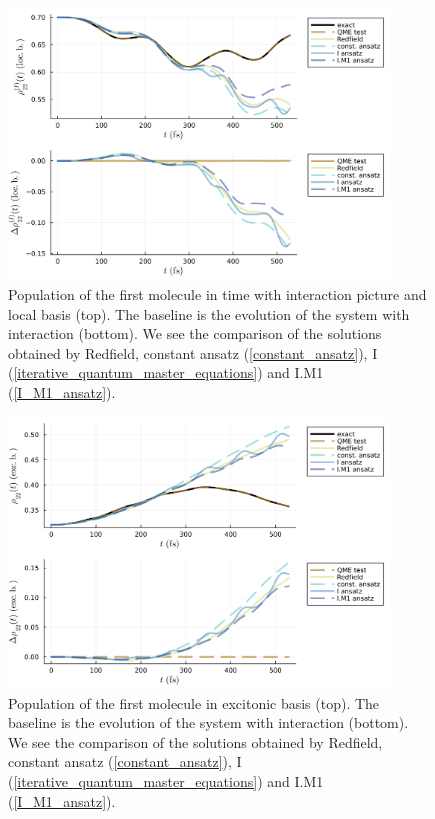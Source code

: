 \newpage
\begin{figure}[H]
\centering
\includegraphics[width=0.9\textwidth]{img/scans/hr_scan_2_intloc22_15_15.png}
\caption{Population of the first molecule in time with interaction picture and local basis (top). The baseline is the evolution of the system with interaction (bottom). We see the comparison of the solutions obtained by Redfield, constant ansatz (\ref{constant_ansatz}), I (\ref{iterative_quantum_master_equations}) and I.M1 (\ref{I_M1_ansatz}).}
\label{img:hr_scan_2_intloc22_15_4}
\end{figure}

\begin{figure}[H]
\centering
\includegraphics[width=0.9\textwidth]{img/scans/hr_scan_2_schexc22_15_15.png}
\caption{Population of the first molecule in excitonic basis (top). The baseline is the evolution of the system with interaction (bottom). We see the comparison of the solutions obtained by Redfield, constant ansatz (\ref{constant_ansatz}), I (\ref{iterative_quantum_master_equations}) and I.M1 (\ref{I_M1_ansatz}). }
\label{img:hr_scan_2_schexc22_15_4}
\end{figure}



